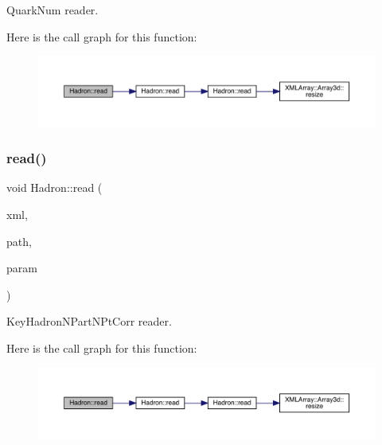 Quark\+Num reader. 

Here is the call graph for this function\+:
\nopagebreak
\begin{figure}[H]
\begin{center}
\leavevmode
\includegraphics[width=350pt]{d1/daf/namespaceHadron_a1f04a3926b07155fbf7e7887169d7f4e_cgraph}
\end{center}
\end{figure}
\mbox{\label{namespaceHadron_a85b27e940a60880e6f98fb6a939d96c2}} 
\subsubsection{\texorpdfstring{read()}{read()}\hspace{0.1cm}{\footnotesize\ttfamily [20/94]}}
{\footnotesize\ttfamily void Hadron\+::read (\begin{DoxyParamCaption}\item[{\mbox{\hyperlink{classADATXML_1_1XMLReader}{X\+M\+L\+Reader}} \&}]{xml,  }\item[{const std\+::string \&}]{path,  }\item[{\mbox{\hyperlink{structHadron_1_1KeyHadronNPartNPtCorr__t}{Key\+Hadron\+N\+Part\+N\+Pt\+Corr\+\_\+t}} \&}]{param }\end{DoxyParamCaption})}



Key\+Hadron\+N\+Part\+N\+Pt\+Corr reader. 

Here is the call graph for this function\+:
\nopagebreak
\begin{figure}[H]
\begin{center}
\leavevmode
\includegraphics[width=350pt]{d1/daf/namespaceHadron_a85b27e940a60880e6f98fb6a939d96c2_cgraph}
\end{center}
\end{figure}
\mbox{\label{namespaceHadron_ab1a8a0ffcdeeae3ff66ed453c1609de7}} 
